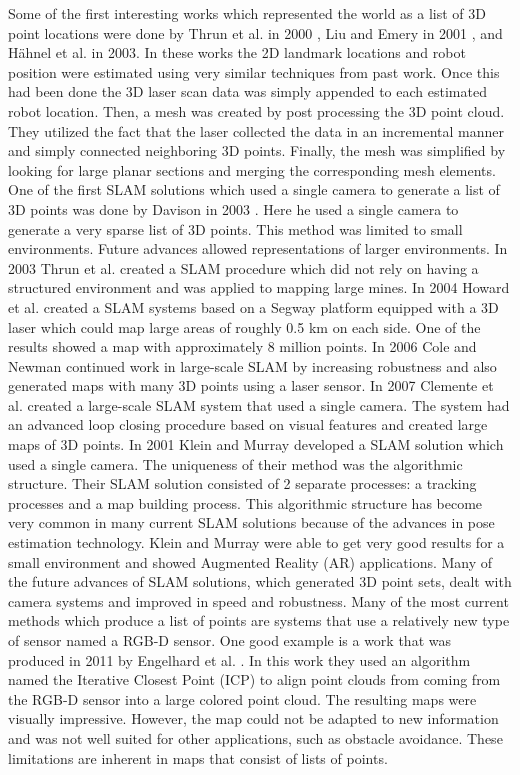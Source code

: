 \documentclass[12pt]{article}
\begin{document}
Some of the first interesting works which represented the world as a list
of 3D point locations were done by Thrun et al. in 2000 \cite{Thrun2000},
Liu and Emery in 2001 \cite{Liu2001}, and H\"{a}hnel et al. in 2003. In
these works the 2D landmark locations and robot position were estimated
using very similar techniques from past work. Once this had been done the 3D
laser scan data was simply appended to each estimated robot location. Then,
a mesh was created by post processing the 3D point cloud. They utilized the
fact that the laser collected the data in an incremental manner and simply
connected neighboring 3D points. Finally, the mesh was simplified by
looking for large planar sections and merging the corresponding mesh
elements. One of the first SLAM solutions which used a single camera to
generate a list of 3D points was done by Davison in 2003
\cite{Davison2003}. Here he used a single camera to generate a very sparse
list of 3D points. This method was limited to small environments. Future
advances allowed representations of larger environments. In 2003 Thrun et
al.  \cite{Thrun2003} created a SLAM procedure which did not rely on having
a structured environment and was applied to mapping large mines. In 2004
Howard et al. \cite{Howard2004} created a SLAM systems based on a Segway
platform equipped with a 3D laser which could map large areas of roughly 0.5
km on each side.  One of the results showed a map with approximately 8
million points. In 2006 Cole and Newman \cite{Cole2006} continued work in
large-scale SLAM by increasing robustness and also generated maps with many
3D points using a laser sensor. In 2007 Clemente et al. created a
large-scale SLAM system that used a single camera. The system had an
advanced loop closing procedure based on visual features and created large
maps of 3D points. In 2001 Klein and Murray \cite{Klein2007} developed a
SLAM solution which used a single camera. The uniqueness of their
method was the algorithmic structure. Their SLAM solution consisted of 2
separate processes: a tracking processes and a map building process. This
algorithmic structure has become very common in many current SLAM solutions
because of the advances in pose estimation technology. Klein and Murray
were able to get very good results for a small environment and showed
Augmented Reality (AR) applications.  Many of the future advances of SLAM
solutions, which generated 3D point sets, dealt with camera systems
\cite{Paz2008,Konolige2008,Strasdat2010} and improved in speed and
robustness. Many of the most current methods which produce a list of points
are systems that use a relatively new type of sensor named a RGB-D sensor.
One good example is a work that was produced in 2011 by Engelhard et al.
\cite{Engelhard2011}. In this work they used an algorithm named the
Iterative Closest Point (ICP) \cite{Rusinkiewicz} to align point clouds
from coming from the RGB-D sensor into a large colored point cloud.  The
resulting maps were visually impressive. However, the map could not be
adapted to new information and was not well suited for other applications,
such as obstacle avoidance. These limitations are inherent in maps that
consist of lists of points.  
 
\end{document}
